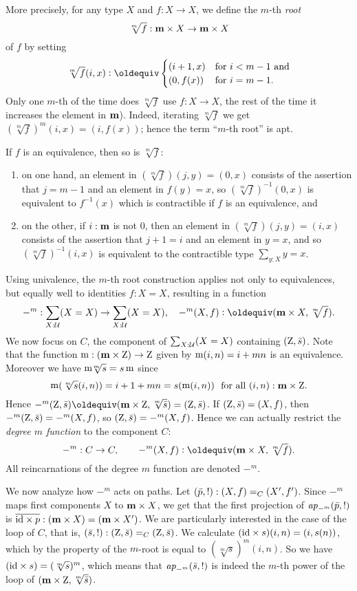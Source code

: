 \begin{example}
More precisely, for any type $X$ and $f:X\to X$, we define the $m$-th \emph{root}
\[
{\sqrt[m]f} : {\mathbf{m}\times X} \to {\mathbf{m}\times X}
\]
of $f$ by setting 
\[
\sqrt[m]f(i,x)\defeq
\begin{cases}
  (i+1,x)& \text{for $i<m-1$ and}\\
  (0,f(x))& \text{for $i=m-1$}.
\end{cases}
\] 
Only one $m$-th of the time does $\sqrt[m]f$ use $f:X\to X$,
the rest of the time it increases the element in $\mathbf{m}$).
Indeed, iterating $\sqrt[m]f$ we get $(\sqrt[m]f)^m(i,x)=(i,f(x))$; 
hence the term ``$m$-th root'' is apt.

If $f$ is an equivalence, then so is $\sqrt[m]f$:
\begin{enumerate}
\item on one hand, an element in  $(\sqrt[m]f)(j,y) = (0,x)$ consists 
of the assertion that  $j=m-1$ and an element in $f(y)=x$,
so  $(\sqrt[m]f)^{-1}(0,x)$ is equivalent 
to $f^{-1}(x)$ which is contractible if $f$ is an equivalence, and 
\item on the other, if $i:\mathbf{m}$ is not $0$, then 
 an element in $(\sqrt[m]f)(j,y)=(i,x)$
 consists of the assertion that $j+1=i$ and an element in   $y=x$, and so 
$(\sqrt[m]f)^{-1}(i,x)$ is equivalent to the contractible type $\sum_{y:X}y=x$.
\end{enumerate}

Using univalence, the $m$-th root construction applies not only to equivalences, 
but equally well to identities $f:X=X$, resulting in a function 
\[
-^m:\sum_{X:\UU}(X=X)\to\sum_{X:\UU}(X=X),\quad -^m(X,f)\defeq(\bn m\times X,\sqrt[m]f).
\]
We now focus on  $C$, the component of $\sum_{X:\mathcal{U}}(X=X)$ containing $(\mathrm{Z},\bar {s})$.
Note that the function $\mathop{\mathrm{m}} : (\mathbf{m}\times \mathrm{Z}) \to \mathrm{Z}$ 
given by $\mathop{\mathrm{m}}(i,n)=i+mn$ is an equivalence. 
Moreover we have ${\mathop{\mathrm{m}}\!\!\sqrt[m]s} = {s\mathop{\mathrm{m}}}$ since 
\[
\mathop{\mathrm{m}}(\sqrt[m]s(i,n)) = i+1+mn = s(\mathop{\mathrm{m}}(i,n))
~~\text{for all $(i,n):\mathbf{m}\times \mathrm{Z}$}.
\]  
Hence $ -^m(\zet,\etop{s}) \jdeq (\bn m\times\zet,\sqrt[m]{\etop{s}}) = (\zet,\etop{s})$. 
If $(\mathrm{Z},\bar {s})=(X,f)$, then $-^m(\mathrm{Z},\bar {s})=-^m(X,f)$, 
so $(\mathrm{Z},\bar {s})=-^m(X,f)$. Hence we can actually restrict the
\emph{degree $m$ function} to the component $C$: 
\[
-^m:C\to C,\qquad -^m(X,f)\defeq(\bn m\times X,\sqrt[m]f).%
\]
All reincarnations of the degree $m$ function are denoted $-^m$.

We now analyze how $-^m$ acts on paths. Let $(\bar {p},!):(X,f)=_C(X',f')$.
Since $-^m$ maps first components $X$ to $\mathbf{m}\times X$, we get that
the first projection of $\mathop{{\it ap}_{-^m}}(\bar {p},!)$ is 
$\overline{\mathord{\mathrm{id}}\times p} : (\mathbf{m}\times X) = (\mathbf{m}\times X')$.
We are particularly interested in the case of the loop of $C$, 
that is, $(\bar {s},!):(\mathrm{Z},\bar {s})=_C(\mathrm{Z},\bar {s})$.
We calculate $(\mathord{\mathrm{id}}\times s)(i,n) = (i,s(n))$,
which by the property of the $m$-root is equal to $(\sqrt[m]s)^m(i,n)$.
So we have $(\mathord{\mathrm{id}}\times s)=(\sqrt[m]s)^m$, which means that
$\mathop{{\it ap}_{-^m}}(\bar {s},!)$ is indeed the $m$-th power of the
loop of $(\mathbf{m}\times \mathrm{Z},\sqrt[m]{\bar {s}})$.


\end{example}
